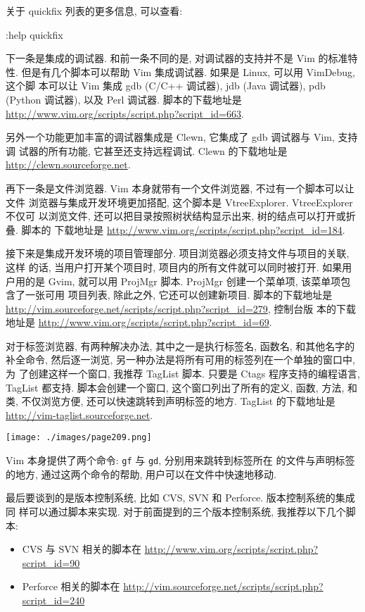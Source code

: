 关于 quickfix 列表的更多信息, 可以查看:
\begin{vimcode}
:help quickfix
\end{vimcode}

下一条是集成的调试器. 和前一条不同的是, 对调试器的支持并不是 Vim 的标准特性.
但是有几个脚本可以帮助 Vim 集成调试器. 如果是 Linux, 可以用 VimDebug, 这个脚
本可以让 Vim 集成 gdb (C/C++ 调试器), jdb (Java 调试器), pdb (Python 调试器),
以及 Perl 调试器. 脚本的下载地址是
\url{http://www.vim.org/scripts/script.php?script_id=663}.

另外一个功能更加丰富的调试器集成是 Clewn, 它集成了 gdb 调试器与 Vim, 支持调
试器的所有功能, 它甚至还支持远程调试. Clewn 的下载地址是
\url{http://clewn.sourceforge.net}.

再下一条是文件浏览器. Vim 本身就带有一个文件浏览器, 不过有一个脚本可以让文件
浏览器与集成开发环境更加搭配, 这个脚本是 VtreeExplorer. VtreeExplorer 不仅可
以浏览文件, 还可以把目录按照树状结构显示出来, 树的结点可以打开或折叠. 脚本的
下载地址是 \url{http://www.vim.org/scripts/script.php?script_id=184}.

接下来是集成开发环境的项目管理部分. 项目浏览器必须支持文件与项目的关联, 这样
的话, 当用户打开某个项目时, 项目内的所有文件就可以同时被打开. 如果用户用的是
Gvim, 就可以用 ProjMgr 脚本. ProjMgr 创建一个菜单项, 该菜单项包含了一张可用
项目列表, 除此之外, 它还可以创建新项目. 脚本的下载地址是
\url{http://vim.sourceforge.net/scripts/script.php?script_id=279}, 控制台版
本的下载地址是 \url{http://www.vim.org/scripts/script.php?script_id=69}.

对于标签浏览器, 有两种解决办法, 其中之一是执行标签名, 函数名, 和其他名字的
补全命令, 然后逐一浏览, 另一种办法是将所有可用的标签列在一个单独的窗口中, 为
了创建这样一个窗口, 我推荐 TagList 脚本. 只要是 Ctags 程序支持的编程语言,
TagList 都支持. 脚本会创建一个窗口, 这个窗口列出了所有的定义, 函数, 方法, 和
类, 不仅浏览方便, 还可以快速跳转到声明标签的地方. TagList 的下载地址是
\url{http://vim-taglist.sourceforge.net}.

\begin{center}
    \texttt{[image: ./images/page209.png]}
\end{center}
Vim 本身提供了两个命令: \texttt{gf} 与 \texttt{gd}, 分别用来跳转到标签所在
的文件与声明标签的地方, 通过这两个命令的帮助, 用户可以在文件中快速地移动.

最后要谈到的是版本控制系统, 比如 CVS, SVN 和 Perforce. 版本控制系统的集成同
样可以通过脚本来实现. 对于前面提到的三个版本控制系统, 我推荐以下几个脚本:
\begin{itemize}
    \item CVS 与 SVN 相关的脚本在
        \url{http://www.vim.org/scripts/script.php?script_id=90}
    \item Perforce 相关的脚本在
        \url{http://vim.sourceforge.net/scripts/script.php?script_id=240}
\end{itemize}

